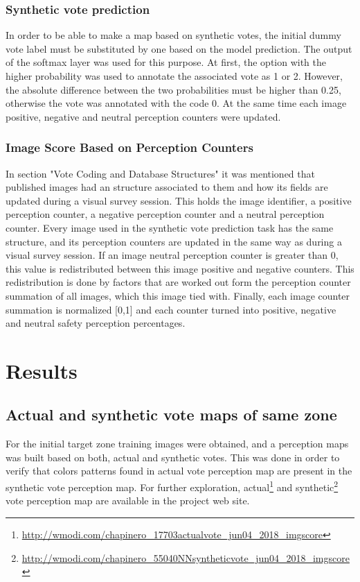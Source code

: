 \documentclass{llncs}
\begin{document}
\subsubsection{Synthetic vote prediction}
In order to be able to make a map based on synthetic votes, the initial dummy vote label must be substituted by one based on the model prediction. The output of the softmax layer was used for this purpose. At first, the option with the higher probability was used to annotate the associated vote as 1 or 2. However, the absolute difference between the two probabilities must be higher than 0.25, otherwise the vote was annotated with the code 0. At the same time each image positive, negative and neutral perception counters were updated.

\subsubsection{Image Score Based on Perception Counters}
In section "Vote Coding and Database Structures" it was mentioned that published images had an structure associated to them and how its fields are updated during a visual survey session. This holds the image identifier, a positive perception counter, a negative perception counter and a neutral perception counter. Every image used in the synthetic vote prediction task has the same structure, and its perception counters are updated in the same way as during a visual survey session. If an image neutral perception counter is greater than 0, this value is redistributed between this image positive and negative counters. This redistribution is done by factors that are worked out form the perception counter summation of all images, which this image tied with. Finally, each image counter summation is normalized [0,1] and each counter turned into positive, negative and neutral safety perception percentages.

\section{Results}
\subsection{Actual and synthetic vote maps of same zone}
For the initial target zone training images were obtained, and a perception maps was built based on both, actual and synthetic votes. This was done in order to verify that colors patterns found in actual vote perception map are present in the synthetic vote perception map. For further exploration, actual\footnote{\href{http://wmodi.com/chapinero\_17703actualvote\_jun04\_2018\_imgscore}{http://wmodi.com/chapinero\_17703actualvote\_jun04\_2018\_imgscore}} and synthetic\footnote{\href{http://wmodi.com/chapinero\_55040NNsyntheticvote\_jun04\_2018\_imgscore}{http://wmodi.com/chapinero\_55040NNsyntheticvote\_jun04\_2018\_imgscore}} vote perception map are available in the project web site.
\end{document}
